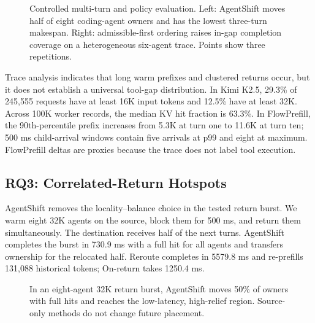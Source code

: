 \begin{figure}[t]
  \centering
  \caption{Controlled multi-turn and policy evaluation. Left: AgentShift moves half of eight coding-agent owners and has the lowest three-turn makespan. Right: admissible-first ordering raises in-gap completion coverage on a heterogeneous six-agent trace. Points show three repetitions.}
  \label{fig:replay-policy}
\end{figure}

Trace analysis indicates that long warm prefixes and clustered returns occur, but it does not establish a universal tool-gap distribution. In Kimi K2.5, 29.3\% of 245,555 requests have at least 16K input tokens and 12.5\% have at least 32K. Across 100K worker records, the median KV hit fraction is 63.3\%. In FlowPrefill, the 90th-percentile prefix increases from 5.3K at turn one to 11.6K at turn ten; 500 ms child-arrival windows contain five arrivals at p99 and eight at maximum. FlowPrefill deltas are proxies because the trace does not label tool execution.

\subsection{RQ3: Correlated-Return Hotspots}\label{rq3-correlated-return-hotspots}

AgentShift removes the locality--balance choice in the tested return burst. We warm eight 32K agents on the source, block them for 500 ms, and return them simultaneously. The destination receives half of the next turns. AgentShift completes the burst in 730.9 ms with a full hit for all agents and transfers ownership for the relocated half. Reroute completes in 5579.8 ms and re-prefills 131,088 historical tokens; On-return takes 1250.4 ms.

\begin{figure}[t]
  \centering
  \caption{In an eight-agent 32K return burst, AgentShift moves 50\% of owners with full hits and reaches the low-latency, high-relief region. Source-only methods do not change future placement.}
  \label{fig:hotspot}
\end{figure}

